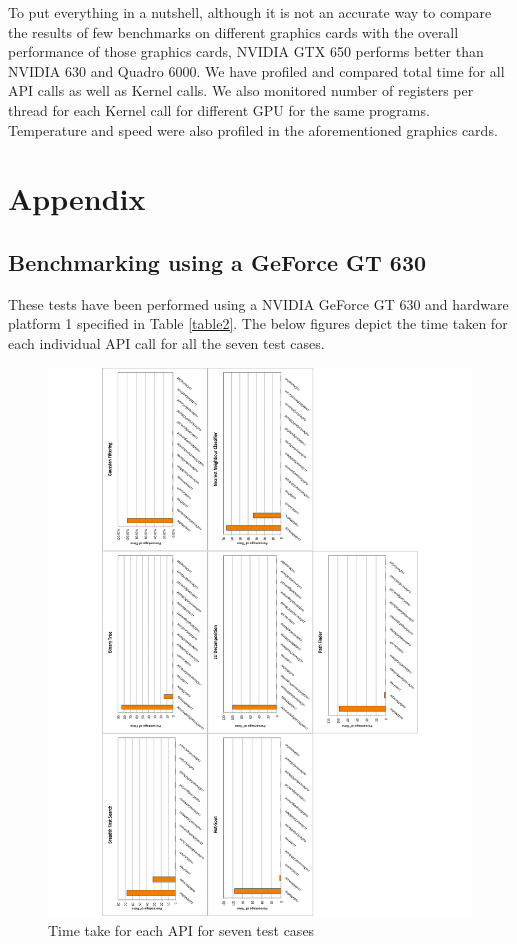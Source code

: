 \documentclass[paper=a4, fontsize=11pt]{scrartcl}
\numberwithin{equation}{section}		%
\numberwithin{figure}{section}			%
\numberwithin{table}{section}				%
\begin{document}
To put everything in a nutshell, although it is not an accurate way to compare the results of few benchmarks on different graphics cards with the overall performance of those graphics cards, NVIDIA GTX 650 performs better than NVIDIA 630 and Quadro 6000. We have profiled and compared total time for all API calls as well as Kernel calls. We also monitored number of registers per thread for each Kernel call for different GPU for the same programs. Temperature and speed were also profiled in the aforementioned graphics cards.

\newpage
\section{Appendix}

\subsection{Benchmarking using a GeForce GT 630}
These tests have been performed using a NVIDIA GeForce GT 630 and hardware platform 1 specified in Table \ref{table2}. The below figures depict the time taken for each individual API call for all the seven test cases.

\begin{figure}[!h]
\centering
\includegraphics[scale=0.6]{../imgs/x630.pdf}
\caption{Time take for each API for seven test cases}
\label{fig:x630}
\end{figure}
\end{document}
